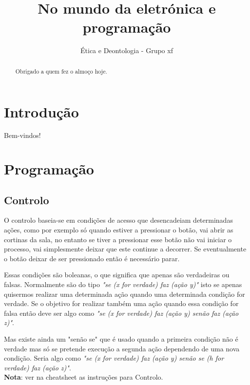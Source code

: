 \documentclass{article}
\begin{document}
\title{No mundo da eletrónica e programação}
\author{Ética e Deontologia - Grupo xf}

\maketitle

\begin{abstract}
Obrigado a quem fez o almoço hoje.
\end{abstract}

\pagebreak
\tableofcontents
\pagebreak

\section{Introdução}
Bem-vindos!

\section{Programação}

\subsection{Controlo}

O controlo baseia-se em condições de acesso que desencadeiam determinadas ações, como por exemplo só quando estiver a pressionar o botão, vai abrir as cortinas da sala, no entanto se tiver a pressionar esse botão não vai iniciar o processo, vai simplesmente deixar que este continue a decorrer. Se eventualmente o botão deixar de ser pressionado então é necessário parar.\newline

Essas condições são boleanas, o que significa que apenas são verdadeiras ou falsas.
Normalmente são do tipo \textit{"se (x for verdade) faz (ação y)"} isto se apenas quisermos realizar uma determinada ação quando uma determinada condição for verdade. Se o objetivo for realizar também uma ação quando essa condição for falsa então deve ser algo como \textit{"se (x for verdade) faz (ação y) senão faz (ação z)"}.\newline

Mas existe ainda um "senão se" que é usado quando a primeira condição não é verdade mas só se pretende execução a segunda ação dependendo de uma nova condição. Seria algo como \textit{"se (x for verdade) faz (ação y) senão se (h for verdade) faz (ação z)"}. \newline \\
\textbf{Nota}: ver na cheatsheet as instruções para Controlo. \\
\end{document}
